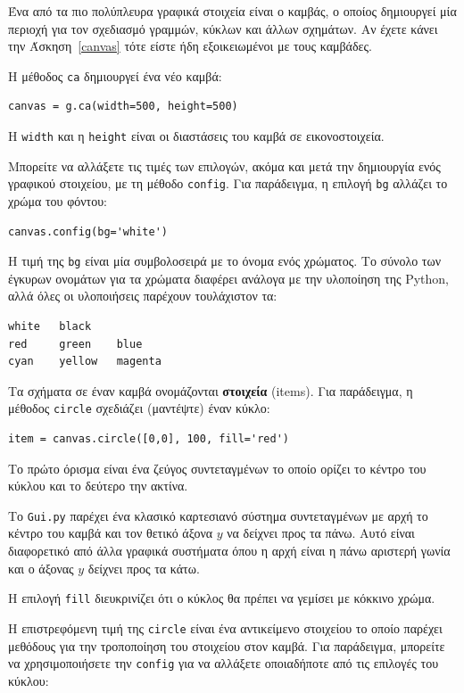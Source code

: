 \documentclass[10pt]{book}
\begin{document}
Ένα από τα πιο πολύπλευρα γραφικά στοιχεία είναι ο καμβάς, ο οποίος δημιουργεί 
μία περιοχή για τον σχεδιασμό γραμμών, κύκλων και άλλων σχημάτων.  Αν έχετε κάνει την 
Άσκηση~\ref{canvas} τότε είστε ήδη εξοικειωμένοι με τους καμβάδες.

Η μέθοδος {\tt ca} δημιουργεί ένα νέο καμβά:

\begin{verbatim}
canvas = g.ca(width=500, height=500)
\end{verbatim}
%
Η {\tt width} και η {\tt height} είναι οι διαστάσεις του καμβά σε
εικονοστοιχεία.

Μπορείτε να αλλάξετε τις τιμές των επιλογών, ακόμα και μετά την δημιουργία ενός γραφικού στοιχείου, με
τη μέθοδο {\tt config}.  Για παράδειγμα, η επιλογή {\tt bg} αλλάζει το χρώμα του φόντου:

\begin{verbatim}
canvas.config(bg='white')
\end{verbatim}
%
Η τιμή της {\tt bg} είναι μία συμβολοσειρά με το όνομα ενός χρώματος.  
Το σύνολο των έγκυρων ονομάτων για τα χρώματα διαφέρει ανάλογα με την υλοποίηση της
Python, αλλά όλες οι υλοποιήσεις παρέχουν τουλάχιστον τα:

\begin{verbatim}
white   black
red     green    blue
cyan    yellow   magenta
\end{verbatim}
%
Τα σχήματα σε έναν καμβά ονομάζονται {\bf στοιχεία} (items).  Για παράδειγμα, η μέθοδος  
{\tt circle} σχεδιάζει (μαντέψτε) έναν κύκλο:

\begin{verbatim}
item = canvas.circle([0,0], 100, fill='red')
\end{verbatim}
%
Το πρώτο όρισμα είναι ένα ζεύγος συντεταγμένων το οποίο ορίζει το κέντρο του κύκλου 
και το δεύτερο την ακτίνα.

Το {\tt Gui.py} παρέχει ένα κλασικό καρτεσιανό σύστημα συντεταγμένων με αρχή
το κέντρο του καμβά και τον θετικό άξονα $y$ να δείχνει προς τα πάνω. Αυτό είναι
διαφορετικό από άλλα γραφικά συστήματα όπου η αρχή είναι η πάνω αριστερή γωνία και
ο άξονας $y$ δείχνει προς τα κάτω.

H επιλογή {\tt fill} διευκρινίζει ότι ο κύκλος θα πρέπει να γεμίσει με 
κόκκινο χρώμα. 

Η επιστρεφόμενη τιμή της  {\tt circle}  είναι ένα αντικείμενο στοιχείου το οποίο 
παρέχει μεθόδους για την τροποποίηση του στοιχείου στον καμβά.  Για παράδειγμα, μπορείτε 
να χρησιμοποιήσετε την  {\tt config}  για να αλλάξετε οποιαδήποτε από τις επιλογές 
του κύκλου:
\end{document}
